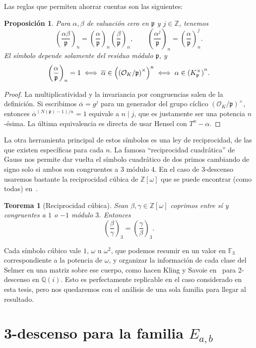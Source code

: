 \documentclass[a4paper]{book}
\theoremstyle{definition}
\theoremstyle{plain}
\newtheorem*{theorem*}{Teorema}
\newtheorem*{prop*}{Proposición}
\newcommand{\nbd}{\nobreakdash}
\newcommand{\QQ}{\mathbb{Q}}
\newcommand{\ZZ}{\mathbb{Z}}
\newcommand{\FF}{\mathbb{F}}
\newcommand{\OO}{\mathcal{O}}
\newcommand{\pp}{\mathfrak{p}}
\newcommand{\leg}[2]{\left(\frac{#1}{#2}\right)}
\newcommand{\cub}[2]{\left(\frac{#1}{#2}\right)_3}
\newcommand{\lp}{\left\lparen}
\newcommand{\rp}{\right\rparen}
\begin{document}
Las reglas que permiten ahorrar cuentas son las siguientes:
\begin{prop*}
Para $\alpha,\beta$ de valuación cero en $\pp$ y $j\in\ZZ$, tenemos
\[
\leg{\alpha\beta}{\pp}_n
=\leg{\alpha}{\pp}_n\leg{\beta}{\pp}_n,
\qquad
\leg{\alpha^j}{\pp}_n=\leg{\alpha}{\pp}_n^j.
\]
El símbolo depende solamente del residuo módulo $\pp$, y
\[
\leg{\alpha}{\pp}_n=1
\iff\overline\alpha\in\lp{(\OO_K/\pp)}^\times\rp^n
\iff\alpha\in{(K_\pp^\times)}^n.
\]
\end{prop*}

\begin{proof}
La multiplicatividad y la invariancia por congruencias salen de la definición. Si escribimos $\overline\alpha=g^j$ para un generador del grupo cíclico ${(\OO_K/\pp)}^\times$, entonces $\overline\alpha^{(N(\pp)-1)/n}=1$ equivale a $n\mid j$, que es justamente ser una potencia $n$-ésima. La última equivalencia es directa de usar Hensel con $T^n-\alpha$.
\end{proof}

La otra herramienta principal de estos símbolos es una ley de reciprocidad, de las que existen específicas para cada $n$. La famosa ``reciprocidad cuadrática'' de Gauss nos permite dar vuelta el símbolo cuadrático de dos primos cambiando de signo solo si ambos son congruentes a $3$ módulo 4. En el caso de $3$\nbd-descenso usaremos bastante la reciprocidad cúbica de $\ZZ[\omega]$ que se puede encontrar (como todas) en~\cite{Lemmermeyer2000}.

\begin{theorem*}[Reciprocidad cúbica]
Sean $\beta,\gamma\in\ZZ[\omega]$ coprimos entre sí y congruentes a $1$ o $-1$ módulo $3$. Entonces
\[
\cub{\beta}{\gamma}=\cub{\gamma}{\beta}.
\]
\end{theorem*}

Cada símbolo cúbico vale $1$, $\omega$ u $\omega^2$, que podemos resumir en un valor en $\FF_3$ correspondiente a la potencia de $\omega$, y organizar la información de cada clase del Selmer en una matriz sobre ese cuerpo, como hacen Kling y Savoie en~\cite{KlingSavoie2025} para 2-descenso en $\QQ(i)$. Esto es perfectamente replicable en el caso considerado en esta tesis, pero nos quedaremos con el análisis de una sola familia para llegar al resultado.

\section{3-descenso para la familia \texorpdfstring{$E_{a,b}$}{E (a,b)}}\label{sec:nuestroCasoSeccion}
\end{document}
